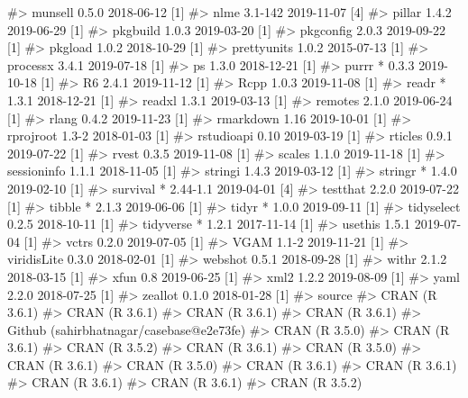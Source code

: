 \documentclass[
]{jss}
\begin{document}
\begin{CodeChunk}
\begin{CodeOutput}
#>  munsell       0.5.0      2018-06-12 [1]
#>  nlme          3.1-142    2019-11-07 [4]
#>  pillar        1.4.2      2019-06-29 [1]
#>  pkgbuild      1.0.3      2019-03-20 [1]
#>  pkgconfig     2.0.3      2019-09-22 [1]
#>  pkgload       1.0.2      2018-10-29 [1]
#>  prettyunits   1.0.2      2015-07-13 [1]
#>  processx      3.4.1      2019-07-18 [1]
#>  ps            1.3.0      2018-12-21 [1]
#>  purrr       * 0.3.3      2019-10-18 [1]
#>  R6            2.4.1      2019-11-12 [1]
#>  Rcpp          1.0.3      2019-11-08 [1]
#>  readr       * 1.3.1      2018-12-21 [1]
#>  readxl        1.3.1      2019-03-13 [1]
#>  remotes       2.1.0      2019-06-24 [1]
#>  rlang         0.4.2      2019-11-23 [1]
#>  rmarkdown     1.16       2019-10-01 [1]
#>  rprojroot     1.3-2      2018-01-03 [1]
#>  rstudioapi    0.10       2019-03-19 [1]
#>  rticles       0.9.1      2019-07-22 [1]
#>  rvest         0.3.5      2019-11-08 [1]
#>  scales        1.1.0      2019-11-18 [1]
#>  sessioninfo   1.1.1      2018-11-05 [1]
#>  stringi       1.4.3      2019-03-12 [1]
#>  stringr     * 1.4.0      2019-02-10 [1]
#>  survival    * 2.44-1.1   2019-04-01 [4]
#>  testthat      2.2.0      2019-07-22 [1]
#>  tibble      * 2.1.3      2019-06-06 [1]
#>  tidyr       * 1.0.0      2019-09-11 [1]
#>  tidyselect    0.2.5      2018-10-11 [1]
#>  tidyverse   * 1.2.1      2017-11-14 [1]
#>  usethis       1.5.1      2019-07-04 [1]
#>  vctrs         0.2.0      2019-07-05 [1]
#>  VGAM          1.1-2      2019-11-21 [1]
#>  viridisLite   0.3.0      2018-02-01 [1]
#>  webshot       0.5.1      2018-09-28 [1]
#>  withr         2.1.2      2018-03-15 [1]
#>  xfun          0.8        2019-06-25 [1]
#>  xml2          1.2.2      2019-08-09 [1]
#>  yaml          2.2.0      2018-07-25 [1]
#>  zeallot       0.1.0      2018-01-28 [1]
#>  source                                  
#>  CRAN (R 3.6.1)                          
#>  CRAN (R 3.6.1)                          
#>  CRAN (R 3.6.1)                          
#>  CRAN (R 3.6.1)                          
#>  Github (sahirbhatnagar/casebase@e2e73fe)
#>  CRAN (R 3.5.0)                          
#>  CRAN (R 3.6.1)                          
#>  CRAN (R 3.5.2)                          
#>  CRAN (R 3.6.1)                          
#>  CRAN (R 3.5.0)                          
#>  CRAN (R 3.6.1)                          
#>  CRAN (R 3.5.0)                          
#>  CRAN (R 3.6.1)                          
#>  CRAN (R 3.6.1)                          
#>  CRAN (R 3.6.1)                          
#>  CRAN (R 3.6.1)                          
#>  CRAN (R 3.5.2)                          

\end{CodeOutput}
\end{CodeChunk}
\end{document}
